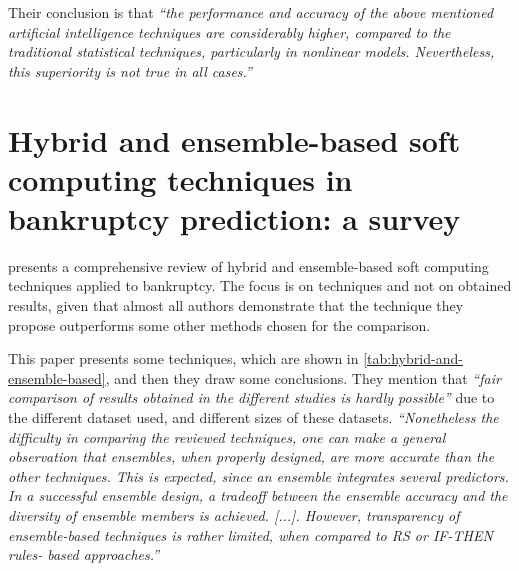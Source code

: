 Their conclusion is that \textit{``the performance and accuracy of the
  above mentioned artificial intelligence techniques are considerably
  higher, compared to the traditional statistical techniques,
  particularly in nonlinear models. Nevertheless, this superiority is
  not true in all cases.''}


\section[\cite{verikas2010hybrid}]{Hybrid and ensemble-based soft
  computing techniques in bankruptcy prediction: a survey}
\label{sec:hybrid-and-ensemble-based}

\cite{verikas2010hybrid} presents a comprehensive review of hybrid and
ensemble-based soft computing techniques applied to bankruptcy. The
focus is on techniques and not on obtained results, given that almost
all authors demonstrate that the technique they propose outperforms
some other methods chosen for the comparison.

This paper presents some techniques, which are shown in
\autoref{tab:hybrid-and-ensemble-based}, and then they draw some
conclusions. They mention that \textit{``fair comparison of results
  obtained in the different studies is hardly possible''} due to the
different dataset used, and different sizes of these datasets.
\textit{``Nonetheless the difficulty in comparing the reviewed
  techniques, one can make a general observation that ensembles, when
  properly designed, are more accurate than the other techniques. This
  is expected, since an ensemble integrates several predictors. In a
  successful ensemble design, a tradeoff between the ensemble accuracy
  and the diversity of ensemble members is achieved. [...]. However,
  transparency of ensemble-based techniques is rather limited, when
  compared to RS or IF-THEN rules- based approaches.''}

